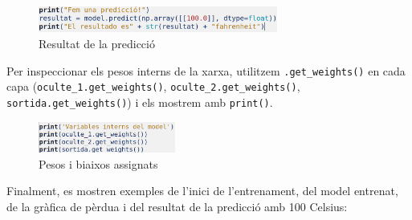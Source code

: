 \begin{figure}[H]
\centering
\includegraphics[width=0.7\textwidth]{./figures/8.png}
\caption{Resultat de la predicció}
\end{figure}

Per inspeccionar els pesos interns de la xarxa, utilitzem \texttt{.get\_weights()} en cada capa (\texttt{oculte\_1.get\_weights()}, \texttt{oculte\_2.get\_weights()}, \texttt{sortida.get\_weights()}) i els mostrem amb \texttt{print()}.

\begin{figure}[H]
\centering
\includegraphics[width=0.4\textwidth]{./figures/9.png}
\caption{Pesos i biaixos assignats}
\end{figure}

Finalment, es mostren exemples de l’inici de l’entrenament, del model entrenat, de la gràfica de pèrdua i del resultat de la predicció amb 100 Celsius:

